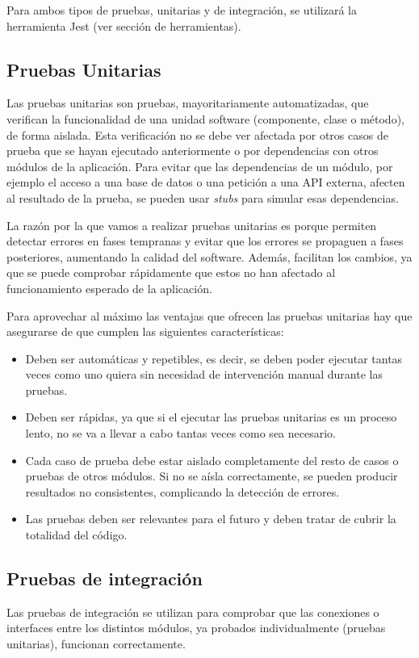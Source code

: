 Para ambos tipos de pruebas, unitarias y de integración, se utilizará la herramienta Jest (ver sección de herramientas).
\subsection{Pruebas Unitarias}
Las pruebas unitarias son pruebas, mayoritariamente automatizadas, que verifican la funcionalidad de una unidad software (componente, clase o método), de forma aislada. Esta verificación no se debe ver afectada por otros casos de prueba que se hayan ejecutado anteriormente o por dependencias con otros módulos de la aplicación. Para evitar que las dependencias de un módulo, por ejemplo el acceso a una base de datos o una petición a una API externa, afecten al resultado de la prueba, se pueden usar \textit{stubs} para simular esas dependencias.

La razón por la que vamos a realizar pruebas unitarias es porque permiten detectar errores en fases tempranas y evitar que los errores se propaguen a fases posteriores, aumentando la calidad del software. Además, facilitan los cambios, ya que se puede comprobar rápidamente que estos no han afectado al funcionamiento esperado de la aplicación.

Para aprovechar al máximo las ventajas que ofrecen las pruebas unitarias hay que asegurarse de que cumplen las siguientes características:
\begin{itemize}
    \item Deben ser automáticas y repetibles, es decir, se deben poder ejecutar tantas veces como uno quiera sin necesidad de intervención manual durante las pruebas.
    \item Deben ser rápidas, ya que si el ejecutar las pruebas unitarias es un proceso lento, no se va a llevar a cabo tantas veces como sea necesario.
    \item Cada caso de prueba debe estar aislado completamente del resto de casos o pruebas de otros módulos. Si no se aísla correctamente, se pueden producir resultados no consistentes, complicando la detección de errores.
    \item Las pruebas deben ser relevantes para el futuro y deben tratar de cubrir la totalidad del código.
\end{itemize}
\subsection{Pruebas de integración}
Las pruebas de integración se utilizan para comprobar que las conexiones o interfaces entre los distintos módulos, ya probados individualmente (pruebas unitarias), funcionan correctamente.

